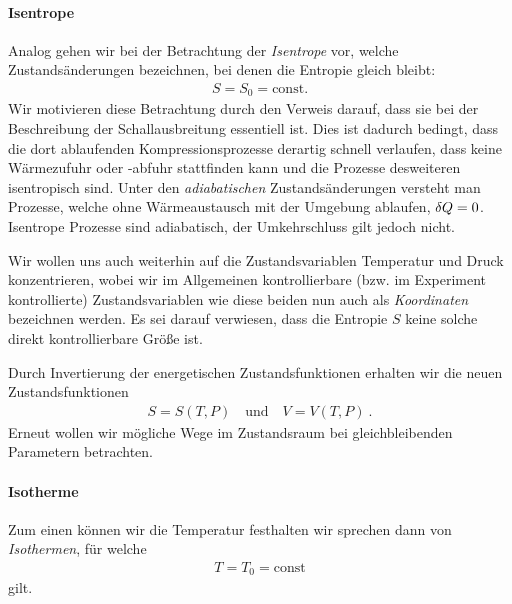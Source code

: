 \paragraph*{Isentrope}
Analog gehen wir bei der Betrachtung der \emph{Isentrope} vor, welche Zustandsänderungen bezeichnen, bei denen die Entropie gleich bleibt:
\begin{align*}
    S=S_0=\mathrm{const}.%
\end{align*}
Wir motivieren diese Betrachtung durch den Verweis darauf, dass sie bei der Beschreibung der Schallausbreitung essentiell ist. Dies ist dadurch bedingt, dass die dort ablaufenden Kompressionsprozesse derartig schnell verlaufen, dass keine Wärmezufuhr oder -abfuhr stattfinden kann und die Prozesse desweiteren isentropisch sind. Unter den \emph{adiabatischen} Zustandsänderungen versteht man Prozesse, welche ohne Wärmeaustausch mit der Umgebung ablaufen, $\mathop{}\!\delta Q=0$. Isentrope Prozesse sind adiabatisch, der Umkehrschluss gilt jedoch nicht. 


Wir wollen uns auch weiterhin auf die Zustandsvariablen Temperatur und Druck konzentrieren, wobei wir im Allgemeinen kontrollierbare (bzw. im Experiment kontrollierte) Zustandsvariablen wie diese beiden nun auch als \emph{Koordinaten} bezeichnen werden. Es sei darauf verwiesen, dass die Entropie $S$ keine solche direkt kontrollierbare Größe ist.

Durch Invertierung der energetischen Zustandsfunktionen erhalten wir die neuen Zustandsfunktionen
\begin{align*}
    \boxed{S=S(T,P) \quad\mathrm{und}\quad V=V(T,P)}\:.
\end{align*}
Erneut wollen wir mögliche Wege im Zustandsraum bei gleichbleibenden Parametern betrachten.


\paragraph*{Isotherme}
Zum einen können wir die Temperatur festhalten \textendash{} wir sprechen dann von \emph{Isothermen}, für welche
\begin{align*}
    T=T_0=\mathrm{const}%
\end{align*}
gilt.



